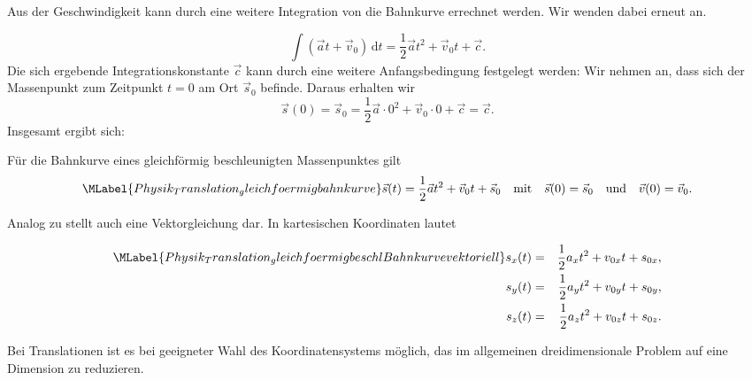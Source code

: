 \begin{MContent}
     Aus der Geschwindigkeit kann durch eine weitere Integration von  die Bahnkurve errechnet werden. Wir wenden dabei erneut  an.
     
     
     $$
     \int (\vec{a}t + \vec{v}_0)\,\textrm{d}t=\frac{1}{2}\vec{a}t^2+\vec{v}_0t+\vec{c}.
     $$
     Die sich ergebende Integrationskonstante $\vec{c}$ kann durch eine weitere Anfangsbedingung festgelegt werden: Wir nehmen an, dass sich der Massenpunkt zum Zeitpunkt $t=0$ am Ort $\vec{s}_0$ befinde. Daraus erhalten wir
     $$
     \vec{s}(0)=\vec{s}_0=\frac{1}{2}\vec{a}\cdot 0^2+\vec{v}_0\cdot 0+\vec{c}=\vec{c}.
     $$
     Insgesamt ergibt sich:
     \begin{MInfo}
     F\"ur die Bahnkurve eines gleichf\"ormig beschleunigten Massenpunktes gilt
     \begin{equation}\MLabel{Physik_Translation_gleichfoermigbahnkurve}
     \vec{s}(t)=\frac{1}{2}\vec{a}t^2+\vec{v}_0t+\vec{s}_0\quad\text{mit} \quad \vec{s}(0)=\vec{s}_0\quad\text{und} \quad \vec{v}(0)=\vec{v}_0. 
     \end{equation}
     \end{MInfo}
     
     Analog zu  stellt auch  eine Vektorgleichung dar. In kartesischen Koordinaten lautet  
     
     \begin{eqnarray}
          \MLabel{Physik_Translation_ gleichfoermigbeschlBahnkurvevektoriell}
          \nonumber s_x(t)&=&\frac{1}{2}a_x t^2+v_{0x}t+s_{0x},\\
          s_y(t)&=&\frac{1}{2}a_y t^2+v_{0y}t+s_{0y},\\
         \nonumber s_z(t)&=&\frac{1}{2}a_z t^2+v_{0z}t+s_{0z}.
     \end{eqnarray}
          
     Bei Translationen ist es bei geeigneter Wahl des Koordinatensystems m\"oglich, das im allgemeinen dreidimensionale Problem auf eine Dimension zu reduzieren.
     
     \end{MContent}
     
